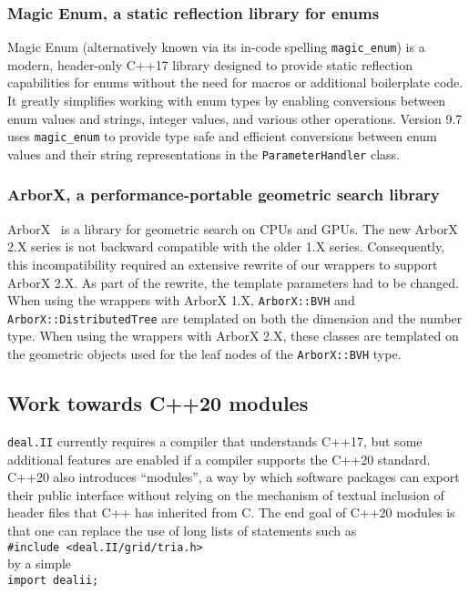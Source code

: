 \documentclass{ansarticle-preprint}
\newcommand{\specialword}[1]{\texttt{#1}}
\newcommand{\dealii}{{\specialword{deal.II}}\xspace}
\begin{document}
\subsubsection{Magic Enum, a static reflection library for enums}

Magic Enum (alternatively known via its in-code spelling \texttt{magic\_enum}) is a modern, header-only C++17 library designed to provide static reflection capabilities for enums without the need for macros or additional boilerplate code. It greatly simplifies working with enum types by enabling conversions between enum values and strings, integer values, and various other operations. Version 9.7 uses \texttt{magic\_enum} to provide type safe and efficient conversions between enum values and their string representations in the \texttt{ParameterHandler} class.



\subsubsection{ArborX, a performance-portable geometric search library}
ArborX~\cite{prokopenko2025} is a library for geometric search on CPUs and GPUs.
The new ArborX 2.X series is not backward compatible with the older 1.X series.
Consequently, this incompatibility required an extensive rewrite of our wrappers to
support ArborX 2.X. As part of the rewrite, the template parameters had to
be changed. When using the wrappers with ArborX 1.X, \texttt{ArborX::BVH}
and \texttt{ArborX::DistributedTree} are templated on both the dimension and
the number type. When using the wrappers with ArborX 2.X, these classes are
templated on the geometric objects used for the leaf nodes of the
\texttt{ArborX::BVH} type.


\subsection{Work towards C++20 modules}
\label{subsec:modules}

\dealii{} currently requires a compiler that understands C++17, but
some additional features are enabled if a compiler supports the C++20
standard. C++20 also introduces ``modules'', a way by which software
packages can export their public interface without relying on the
mechanism of textual inclusion of header files that C++ has inherited from C. The
end goal of C++20 modules is that one can replace the use of long
lists of statements such as\\
\hspace*{1cm}\texttt{\#include <deal.II/grid/tria.h>}\\
by a simple\\
\hspace*{1cm}\texttt{import dealii;}
\end{document}
